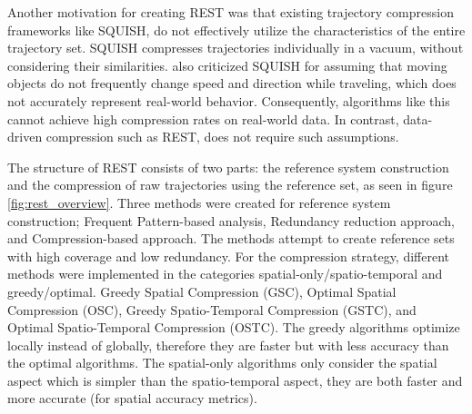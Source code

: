 Another motivation for creating REST was that existing trajectory compression frameworks like SQUISH, do not effectively utilize the characteristics of the entire trajectory set. SQUISH compresses trajectories individually in a vacuum, without considering their similarities. \textcite{zhao2018rest} also criticized SQUISH for assuming that moving objects do not frequently change speed and direction while traveling, which does not accurately represent real-world behavior. Consequently, algorithms like this cannot achieve high compression rates on real-world data. In contrast, data-driven compression such as REST, does not require such assumptions.

The structure of REST consists of two parts: the reference system construction and the compression of raw trajectories using the reference set, as seen in figure \ref*{fig:rest_overview}. Three methods were created for reference system construction; Frequent Pattern-based analysis, Redundancy reduction approach, and Compression-based approach. The methods attempt to create reference sets with high coverage and low redundancy. For the compression strategy, different methods were implemented in the categories spatial-only/spatio-temporal and greedy/optimal. Greedy Spatial Compression (GSC), Optimal Spatial Compression (OSC), Greedy Spatio-Temporal Compression (GSTC), and Optimal Spatio-Temporal Compression (OSTC). The greedy algorithms optimize locally instead of globally, therefore they are faster but with less accuracy than the optimal algorithms. The spatial-only algorithms only consider the spatial aspect which is simpler than the spatio-temporal aspect, they are both faster and more accurate (for spatial accuracy metrics).

